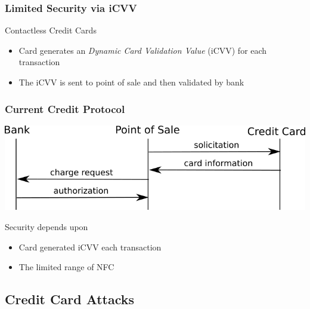 \documentclass[unknownkeysallowed]{beamer}
\begin{document}
\begin{frame}
\frametitle{Limited Security via iCVV}
  \begin{center}
  \begin{minipage}{.9\textwidth}
  \begin{block}{Contactless Credit Cards}
    \begin{itemize}
      \item{Card generates an \textit{Dynamic Card Validation Value} (iCVV) for each transaction}
      \pause
      \item{The iCVV is sent to point of sale and then validated by bank}
    \end{itemize}
  \end{block}
  \end{minipage}
  \end{center}
\end{frame}

\begin{frame}
\frametitle{Current Credit Protocol}
  \begin{center}
  \includegraphics[scale=.5]{../TomPaper/figures/CCcurrent.png}\newline
    \begin{minipage}{.6\textwidth}
      \vspace{3mm}
      \begin{block}{Security depends upon}
        \begin{itemize}
          \item{Card generated iCVV each transaction}
          \item{The limited range of NFC}
        \end{itemize}
      \end{block}
    \end{minipage}
  \end{center}
\end{frame}




\subsection{Credit Card Attacks}
\end{document}
